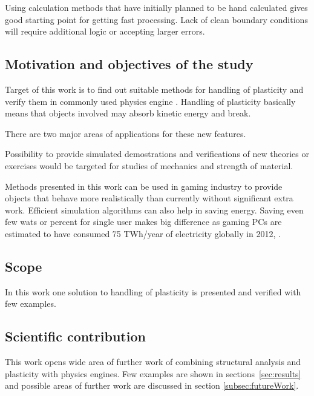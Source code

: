 Using calculation methods that have initially planned to be hand calculated gives good starting point for 
getting fast processing. Lack of clean boundary conditions will require additional logic or accepting larger errors.


\subsection{Motivation and objectives of the study}

Target of this work is to find out suitable methods for handling of plasticity and verify them 
in commonly used physics engine \bullet. 
Handling of plasticity basically means that objects involved may absorb kinetic energy and break. 

There are two major areas of applications for these new features.

Possibility to provide simulated demostrations and verifications of new theories or exercises  would be targeted for 
studies of mechanics and strength of material. 
 
Methods presented in this work can be used in gaming industry to provide objects that behave more realistically than currently without significant extra work. Efficient simulation algorithms can also help in saving energy. Saving even few wats or percent for single user makes big difference as gaming PCs are estimated to have consumed 75 TWh/year of electricity globally in 2012, \cite{gaming.energy}.

\subsection{Scope}

In this work one solution to handling of plasticity is presented and verified with few examples.

\subsection{Scientific contribution}

This work opens wide area of further work of combining structural analysis and plasticity with physics engines.
Few examples are shown in sections~\ref{sec:results} and possible areas of further work are discussed in section \ref{subsec:futureWork}.

\cleardoublepage
